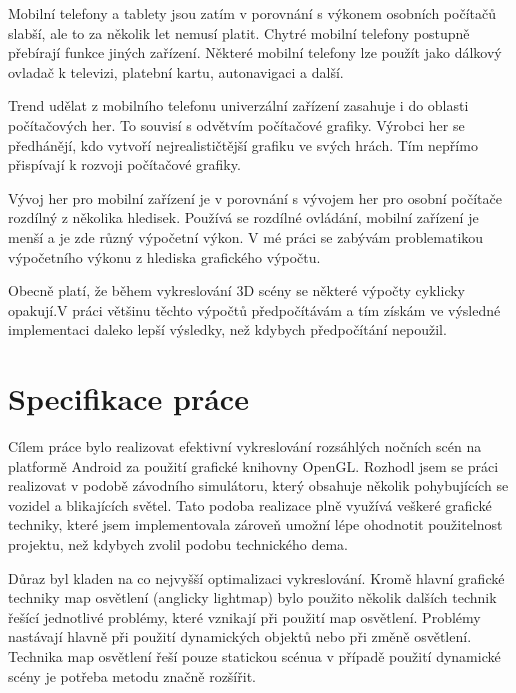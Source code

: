 \documentclass[11pt,twoside,a4paper]{book}
\begin{document}
Mobilní telefony a tablety jsou zatím v porovnání s výkonem osobních počítačů slabší, ale to za několik let nemusí platit. Chytré mobilní telefony postupně přebírají funkce jiných zařízení. Některé mobilní telefony lze použít jako dálkový ovladač k televizi, platební kartu, autonavigaci a další.

Trend udělat z mobilního telefonu univerzální zařízení zasahuje i do oblasti počítačových her. To souvisí s odvětvím počítačové grafiky. Výrobci her se předhánějí, kdo vytvoří nejrealističtější grafiku ve svých hrách. Tím nepřímo přispívají k rozvoji počítačové grafiky.

Vývoj her pro mobilní zařízení je v porovnání s vývojem her pro osobní počítače rozdílný z několika hledisek. Používá se rozdílné ovládání, mobilní zařízení je menší a je zde různý výpočetní výkon. V mé práci se zabývám problematikou výpočetního výkonu z hlediska grafického výpočtu.

Obecně platí, že během vykreslování 3D scény se některé výpočty cyklicky opakují.\linebreak V práci většinu těchto výpočtů předpočítávám a tím získám ve výsledné implementaci daleko lepší výsledky, než kdybych předpočítání nepoužil.

\chapter{Specifikace práce}
Cílem práce bylo realizovat efektivní vykreslování rozsáhlých nočních scén na platformě Android za použití grafické knihovny OpenGL. Rozhodl jsem se práci realizovat v podobě závodního simulátoru, který obsahuje několik pohybujících se vozidel a blikajících světel. Tato podoba realizace plně využívá veškeré grafické techniky, které jsem implementoval\linebreak a zároveň umožní lépe ohodnotit použitelnost projektu, než kdybych zvolil podobu technického dema.

Důraz byl kladen na co nejvyšší optimalizaci vykreslování. Kromě hlavní grafické techniky map osvětlení (anglicky lightmap) bylo použito několik dalších technik řešící jednotlivé problémy, které vznikají při použití map osvětlení. Problémy nastávají hlavně při použití dynamických objektů nebo při změně osvětlení. Technika map osvětlení řeší pouze statickou scénu\linebreak a v případě použití dynamické scény je potřeba metodu značně rozšířit.
\end{document}
